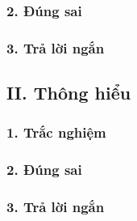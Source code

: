 \subsubsection*{2. Đúng sai}

\subsubsection*{3. Trả lời ngắn}

\subsection*{II. Thông hiểu}

\subsubsection*{1. Trắc nghiệm}

\subsubsection*{2. Đúng sai}

\subsubsection*{3. Trả lời ngắn}

